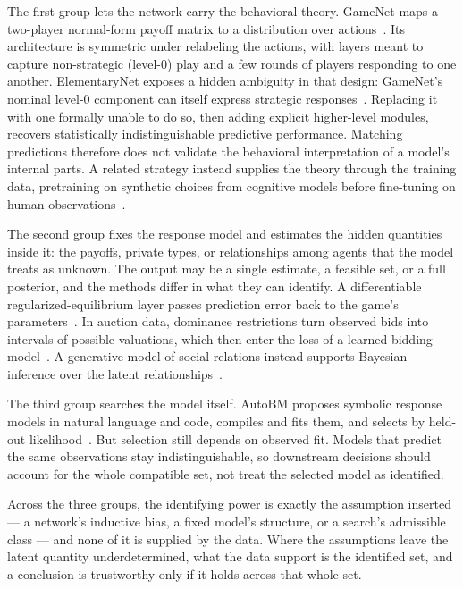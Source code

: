  The first group lets the network carry the
behavioral theory. GameNet maps a two-player normal-form payoff matrix to a
distribution over actions~\citep{Hartford2016}. Its architecture is symmetric under
relabeling the actions, with layers meant to capture non-strategic (level-$0$) play
and a few rounds of players responding to one another. ElementaryNet exposes a hidden ambiguity in that
design: GameNet's nominal level-$0$ component can itself express strategic
responses~\citep{DEon2026ElementaryNet}. Replacing it with one formally unable to do
so, then adding explicit higher-level modules, recovers statistically
indistinguishable predictive performance. Matching predictions therefore does not
validate the behavioral interpretation of a model's internal parts. A related strategy instead supplies the theory through the training data,
pretraining on synthetic choices from cognitive models before fine-tuning on human
observations~\citep{Bourgin2019}.

 The second group fixes the
response model and estimates the hidden quantities inside it: the payoffs, private types, or
relationships among agents that the model treats as unknown. The output may
be a single estimate, a feasible set, or a full posterior, and the methods differ in
what they can identify. A differentiable regularized-equilibrium layer passes
prediction error back to the game's parameters~\citep{Ling2018}. In auction data,
dominance restrictions turn observed bids into intervals of possible valuations,
which then enter the loss of a learned bidding model~\citep{CuiYu2023}. A generative
model of social relations instead supports Bayesian inference over the latent
relationships~\citep{Shum2019}.

 The third group searches the model itself.
AutoBM proposes symbolic response models in natural language and code, compiles and
fits them, and selects by held-out likelihood~\citep{AutoBM2026}. But selection
still depends on observed fit. Models that predict the same observations stay
indistinguishable, so downstream decisions should account for the whole compatible
set, not treat the selected model as identified.

Across the three groups, the identifying power is exactly the assumption inserted
--- a network's inductive bias, a fixed model's structure, or a search's admissible
class --- and none of it is supplied by the data. Where the assumptions leave the
latent quantity underdetermined, what the data support is the identified set, and a
conclusion is trustworthy only if it holds across that whole set.

